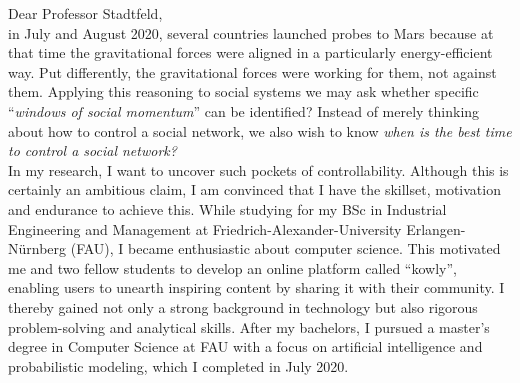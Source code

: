 Dear Professor Stadtfeld,\\

in July and August 2020, several countries launched probes to Mars because at that time the gravitational forces were aligned in a particularly energy-efficient way. 
Put differently, the gravitational forces were working for them, not against them.
Applying this reasoning to social systems we may ask whether specific ``\textit{windows of social momentum}'' can be identified? 
Instead of merely thinking about how to control a social network, we also wish to know \textit{when is the best time to control a social network?}\\

In my research, I want to uncover such pockets of controllability. 
Although this is certainly an ambitious claim, I am convinced that I have the skillset, motivation and endurance to achieve this. 
While studying for my BSc in Industrial Engineering and Management at Friedrich-Alexander-University Erlangen-Nürnberg (FAU), I became enthusiastic about computer science. 
This motivated me and two fellow students to develop an online platform called ``kowly'', enabling users to unearth inspiring content by sharing it with their community. 
I thereby gained not only a strong background in technology but also rigorous problem-solving and analytical skills.
After my bachelors, I pursued a master's degree in Computer Science at FAU with a focus on artificial intelligence and probabilistic modeling, which I completed in July 2020. \\

